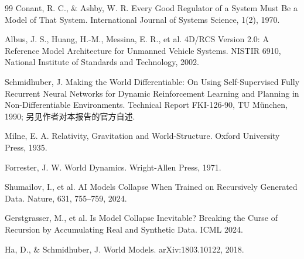 \documentclass[10pt,fontset=fandol]{ctexart}
\begin{document}
\begin{thebibliography}{99}
Conant, R. C., \& Ashby, W. R. Every Good Regulator of a System Must Be a Model of That System. International Journal of Systems Science, 1(2), 1970.

Albus, J. S., Huang, H.-M., Messina, E. R., et al. 4D/RCS Version 2.0: A Reference Model Architecture for Unmanned Vehicle Systems. NISTIR 6910, National Institute of Standards and Technology, 2002.

Schmidhuber, J. Making the World Differentiable: On Using Self-Supervised Fully Recurrent Neural Networks for Dynamic Reinforcement Learning and Planning in Non-Differentiable Environments. Technical Report FKI-126-90, TU M\"unchen, 1990; 另见作者对本报告的官方自述.

Milne, E. A. Relativity, Gravitation and World-Structure. Oxford University Press, 1935.

Forrester, J. W. World Dynamics. Wright-Allen Press, 1971.

Shumailov, I., et al. AI Models Collapse When Trained on Recursively Generated Data. Nature, 631, 755--759, 2024.

Gerstgrasser, M., et al. Is Model Collapse Inevitable? Breaking the Curse of Recursion by Accumulating Real and Synthetic Data. ICML 2024.

Ha, D., \& Schmidhuber, J. World Models. arXiv:1803.10122, 2018.

\end{thebibliography}
\end{document}

